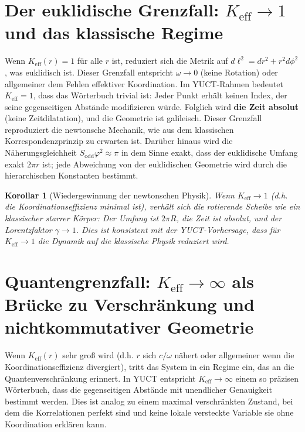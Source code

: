 \documentclass[12pt,a4paper]{article}
\newtheorem{corollary}{Korollar}[section]
\newcommand{\Sodd}{S_{\mathrm{odd}}}
\begin{document}
	\section{Der euklidische Grenzfall: \(K_{\mathrm{eff}} \to 1\) und das klassische Regime}
	\label{sec:euc-limit}
	
	Wenn \(K_{\mathrm{eff}}(r) = 1\) für alle \(r\) ist, reduziert sich die Metrik auf \(d\ell^2 = dr^2 + r^2 d\phi^2\), was euklidisch ist. Dieser Grenzfall entspricht \(\omega \to 0\) (keine Rotation) oder allgemeiner dem Fehlen effektiver Koordination. Im YUCT-Rahmen bedeutet \(K_{\mathrm{eff}} = 1\), dass das Wörterbuch trivial ist: Jeder Punkt erhält keinen Index, der seine gegenseitigen Abstände modifizieren würde. Folglich wird \textbf{die Zeit absolut} (keine Zeitdilatation), und die Geometrie ist galileisch. Dieser Grenzfall reproduziert die newtonsche Mechanik, wie aus dem klassischen Korrespondenzprinzip zu erwarten ist. Darüber hinaus wird die Näherungsgleichheit \(\Sodd \varphi^2 \approx \pi\) in dem Sinne exakt, dass der euklidische Umfang exakt \(2\pi r\) ist; jede Abweichung von der euklidischen Geometrie wird durch die hierarchischen Konstanten bestimmt.
	
	\begin{corollary}[Wiedergewinnung der newtonschen Physik]
		Wenn \(K_{\mathrm{eff}} \to 1\) (d.h. die Koordinationseffizienz minimal ist), verhält sich die rotierende Scheibe wie ein klassischer starrer Körper: Der Umfang ist \(2\pi R\), die Zeit ist absolut, und der Lorentzfaktor \(\gamma \to 1\). Dies ist konsistent mit der YUCT-Vorhersage, dass für \(K_{\mathrm{eff}} \to 1\) die Dynamik auf die klassische Physik reduziert wird.
	\end{corollary}
	
	\section{Quantengrenzfall: \(K_{\mathrm{eff}} \to \infty\) als Brücke zu Verschränkung und nichtkommutativer Geometrie}
	\label{sec:quantum-limit}
	
	Wenn \(K_{\mathrm{eff}}(r)\) sehr groß wird (d.h. \(r\) sich \(c/\omega\) nähert oder allgemeiner wenn die Koordinationseffizienz divergiert), tritt das System in ein Regime ein, das an die Quantenverschränkung erinnert. In YUCT entspricht \(K_{\mathrm{eff}} \to \infty\) einem so präzisen Wörterbuch, dass die gegenseitigen Abstände mit unendlicher Genauigkeit bestimmt werden. Dies ist analog zu einem maximal verschränkten Zustand, bei dem die Korrelationen perfekt sind und keine lokale versteckte Variable sie ohne Koordination erklären kann.
	
\end{document}
